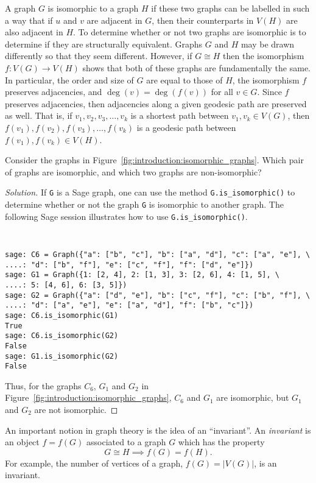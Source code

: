 A graph $G$ is isomorphic to a graph $H$ if these two graphs can be
labelled in such a way that if $u$ and $v$ are adjacent in $G$, then
their counterparts in $V(H)$ are also adjacent in $H$. To determine
whether or not two graphs are isomorphic is to determine if they are
structurally equivalent. Graphs $G$ and $H$ may be drawn differently
so that they seem different. However, if $G \cong H$ then the
isomorphism $f: V(G) \longrightarrow V(H)$ shows that both of these
graphs are fundamentally the same. In particular, the order and size
of $G$ are equal to those of $H$, the isomorphism $f$ preserves
adjacencies, and $\deg(v) = \deg(f(v))$ for all $v \in G$. Since $f$
preserves adjacencies, then adjacencies along a given geodesic path
are preserved as well. That is, if $v_1, v_2, v_3, \dots, v_k$ is a
shortest path between $v_1, v_k \in V(G)$, then
$f(v_1), f(v_2), f(v_3), \dots, f(v_k)$ is a geodesic path between
$f(v_1), f(v_k) \in V(H)$.

\begin{example}
Consider the graphs in
Figure~\ref{fig:introduction:isomorphic_graphs}. Which pair of graphs
are isomorphic, and which two graphs are non-isomorphic?
\end{example}

\begin{proof}[Solution]
If \verb!G! is a Sage graph, one can use the method
\verb!G.is_isomorphic()! to determine whether or not the graph
\verb!G! is isomorphic to another graph. The following Sage session
illustrates how to use \verb!G.is_isomorphic()!.
%
\begin{center}
\fontsize{9pt}{9pt}
\selectfont
\tt
\begin{lstlisting}
sage: C6 = Graph({"a": ["b", "c"], "b": ["a", "d"], "c": ["a", "e"], \
....: "d": ["b", "f"], "e": ["c", "f"], "f": ["d", "e"]})
sage: G1 = Graph({1: [2, 4], 2: [1, 3], 3: [2, 6], 4: [1, 5], \
....: 5: [4, 6], 6: [3, 5]})
sage: G2 = Graph({"a": ["d", "e"], "b": ["c", "f"], "c": ["b", "f"], \
....: "d": ["a", "e"], "e": ["a", "d"], "f": ["b", "c"]})
sage: C6.is_isomorphic(G1)
True
sage: C6.is_isomorphic(G2)
False
sage: G1.is_isomorphic(G2)
False
\end{lstlisting}
\end{center}
%
Thus, for the graphs $C_6$, $G_1$ and $G_2$ in
Figure~\ref{fig:introduction:isomorphic_graphs}, $C_6$ and $G_1$ are
isomorphic, but $G_1$ and $G_2$ are not isomorphic.
\end{proof}

An important notion in graph theory is the idea of an ``invariant''.
An \emph{invariant} is an object $f = f(G)$ associated to a
graph $G$ which has the property
\[
G \cong H \implies f(G) = f(H).
\]
For example, the number of vertices of a graph, $f(G) = |V(G)|$, is an
invariant.
\index{graph invariant}


